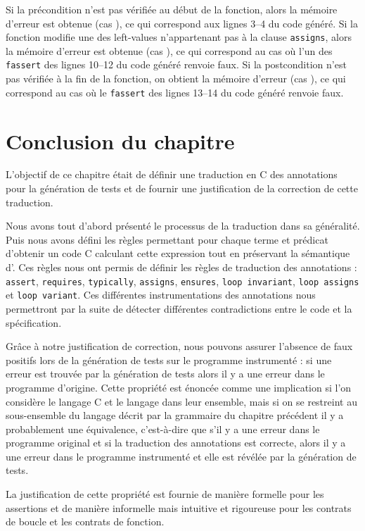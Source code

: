 Si la précondition n'est pas vérifiée au début de la fonction, alors
la mémoire d'erreur est obtenue (cas ), ce qui correspond aux
lignes 3--4 du code généré.
Si la fonction modifie une des left-values n'appartenant pas à la clause
\lstinline'assigns', alors la mémoire d'erreur est obtenue (cas ),
ce qui correspond au cas où l'un des \lstinline'fassert' des lignes 10--12 du
code généré renvoie faux.
Si la postcondition n'est pas vérifiée à la fin de la fonction, on obtient
la mémoire d'erreur (cas ), ce qui correspond au cas où le
\lstinline'fassert' des lignes 13--14 du code généré renvoie faux.


\section*{Conclusion du chapitre}

L'objectif de ce chapitre était de définir une traduction en C des annotations
\eacsl pour la génération de tests et de fournir une justification de la
correction de cette traduction.

Nous avons tout d'abord présenté le processus de la traduction dans sa
généralité.
Puis nous avons défini les règles permettant pour chaque terme et prédicat
\eacsl d'obtenir un code C calculant cette expression tout en préservant la
sémantique d'\eacsl.
Ces règles nous ont permis de définir les règles de traduction des annotations
\eacsl : \lstinline'assert', \lstinline'requires',
\lstinline'typically', \lstinline'assigns', \lstinline'ensures',
\lstinline'loop invariant', \lstinline'loop assigns' et
\lstinline'loop variant'.
Ces différentes instrumentations des annotations nous permettront par la suite
de détecter différentes contradictions entre le code et la spécification.

Grâce à notre justification de correction, nous pouvons assurer l'absence de
faux positifs lors de la génération de tests sur le programme instrumenté : si
une erreur est trouvée par la génération de tests alors il y a une erreur dans
le programme d'origine.
Cette propriété est énoncée comme une implication si l'on considère le langage
C et le langage \eacsl dans leur ensemble, mais si on se restreint au
sous-ensemble du langage décrit par la grammaire du chapitre précédent il y a
probablement une équivalence, c'est-à-dire que s'il y a une erreur dans le
programme original et si la traduction des annotations \eacsl est correcte,
alors il y a une erreur dans le programme instrumenté et elle est révélée par la
génération de tests.

La justification de cette propriété est fournie de manière formelle pour les
assertions et de manière informelle mais intuitive et rigoureuse pour les
contrats de boucle et les contrats de fonction.
